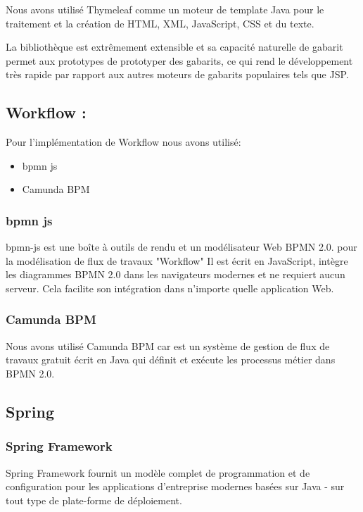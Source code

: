 Nous avons utilisé Thymeleaf comme un moteur de template Java pour le traitement et la création de HTML, XML, JavaScript, CSS et du texte.

La bibliothèque est extrêmement extensible et sa capacité naturelle de gabarit permet aux prototypes de prototyper des gabarits, ce qui rend le développement très rapide par rapport aux autres moteurs de gabarits populaires tels que JSP.

 \subsection{  Workflow :}
Pour l'implémentation de Workflow nous avons utilisé: 
\begin{itemize}
	\item bpmn js
	\item Camunda BPM
\end{itemize}

\subsubsection{bpmn js} 
bpmn-js est une boîte à outils de rendu et un modélisateur Web BPMN 2.0. pour la modélisation de flux de travaux "Workflow" Il est écrit en JavaScript, intègre les diagrammes BPMN 2.0 dans les navigateurs modernes et ne requiert aucun serveur. Cela facilite son intégration dans n’importe quelle application Web.



\subsubsection{ Camunda BPM}
Nous avons utilisé Camunda BPM car est un système de gestion de flux de travaux gratuit écrit en Java qui définit et exécute les processus métier dans BPMN 2.0. 


 \subsection{Spring}
 
  \subsubsection{Spring Framework }
  
  
  Spring Framework fournit un modèle complet de programmation et de configuration pour les applications d'entreprise modernes basées sur Java - sur tout type de plate-forme de déploiement.
   
